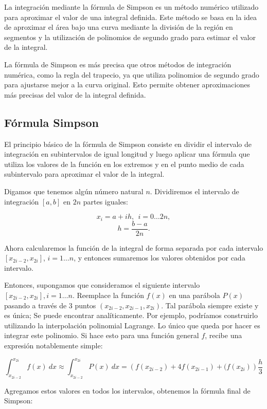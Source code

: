La integración mediante la fórmula de Simpson es un método numérico utilizado para aproximar el valor de una integral definida. Este método se basa en la idea de aproximar el área bajo una curva mediante la división de la región en segmentos y la utilización de polinomios de segundo grado para estimar el valor de la integral.

La fórmula de Simpson es más precisa que otros métodos de integración numérica, como la regla del trapecio, ya que utiliza polinomios de segundo grado para ajustarse mejor a la curva original. Esto permite obtener aproximaciones más precisas del valor de la integral definida.

\subsection{Fórmula Simpson}

El principio básico de la fórmula de Simpson consiste en dividir el intervalo de integración en subintervalos de igual longitud y luego aplicar una fórmula que utiliza los valores de la función en los extremos y en el punto medio de cada subintervalo para aproximar el valor de la integral.

Digamos que tenemos algún número natural $n$. Dividiremos el intervalo de integración $[a, b]$ en $2n$ partes iguales:  

$$x_i = a + i h, ~~ i = 0 \ldots 2n,$$
$$h = \frac {b-a} {2n}.$$

Ahora calcularemos la función de la integral de forma separada por cada intervalo $[x_ {2i-2}, x_ {2i}]$, $i = 1 \ldots n$, y entonces sumaremos los valores obtenidos por  cada  intervalo.

Entonces, supongamos que consideramos el siguiente intervalo $[x_ {2i-2}, x_ {2i}], i = 1 \ldots n$. Reemplace la función $f(x)$ en una parábola $P(x)$ pasando a través de 3 puntos $(x_{2i-2}, x_{2i-1}, x_{2i})$. Tal parábola siempre existe y es única; Se puede encontrar analíticamente. Por ejemplo, podríamos construirlo utilizando la interpolación polinomial Lagrange. Lo único que queda por hacer es integrar este polinomio. Si hace esto para una función general $f$, recibe una expresión notablemente simple:

$$\int_{x_{2i-2}}^{x_{2i}}f(x)~dx\approx \int_{x_{2i-2}}^{x_{2i}}P(x)~dx =\left(f(x_{2i-2})+ 4f(x_{2i-1})+(f(x_{2i})\right)\frac{h}{3}$$

Agregamos estos valores en todos los intervalos, obtenemos la fórmula final de Simpson:

